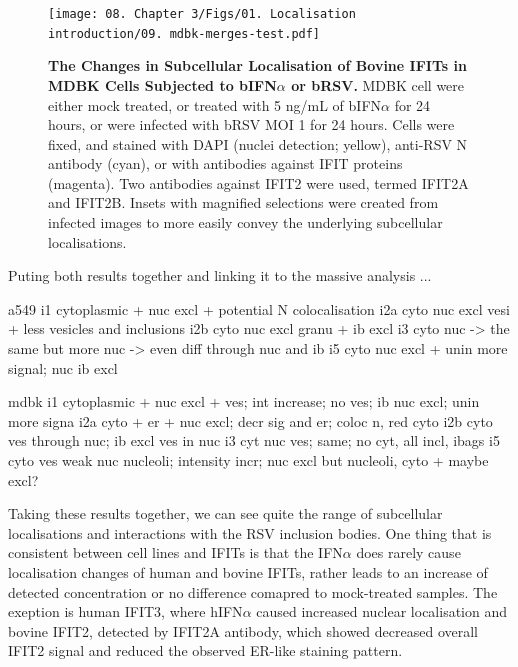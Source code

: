 \begin{figure}
    \centering
    \texttt{[image: 08. Chapter 3/Figs/01. Localisation introduction/09. mdbk-merges-test.pdf]}
    \caption[The Changes in Subcellular Localisation of Bovine IFITs in MDBK Cells Subjected to bIFN\(\alpha\) or bRSV.]{\textbf{The Changes in Subcellular Localisation of Bovine IFITs in MDBK Cells Subjected to bIFN\(\alpha\) or bRSV.} MDBK cell were either mock treated, or treated with 5 ng/mL of bIFN\(\alpha\) for 24 hours, or were infected with bRSV MOI 1 for 24 hours. Cells were fixed, and stained with DAPI (nuclei detection; yellow), anti-RSV N antibody (cyan), or with antibodies against IFIT proteins (magenta). Two antibodies against IFIT2 were used, termed IFIT2A and IFIT2B. Insets with magnified selections were created from infected images to more easily convey the underlying subcellular localisations.}
    \label{fig:The Changes in Subcellular Localisation of Bovine IFITs in MDBK Cells Subjected to bIFNa or bRSV}
\end{figure}

Puting both results together and linking it to the massive analysis ...

a549
i1 cytoplasmic + nuc excl + potential N colocalisation
i2a cyto nuc excl vesi + less vesicles and inclusions
i2b cyto nuc excl granu + ib excl
i3 cyto nuc -> the same but more nuc -> even diff through nuc and ib
i5 cyto nuc excl + unin more signal; nuc ib excl

mdbk
i1 cytoplasmic + nuc excl + ves; int increase; no ves; ib nuc excl; unin more signa
i2a cyto + er + nuc excl; decr sig and er; coloc n, red cyto
i2b cyto ves through nuc; ib excl ves in nuc
i3 cyt nuc ves; same; no cyt, all incl, ibags
i5 cyto ves weak nuc nucleoli; intensity incr; nuc excl but nucleoli, cyto + maybe excl?

Taking these results together, we can see quite the range of subcellular localisations and interactions with the RSV inclusion bodies. One thing that is consistent between cell lines and IFITs is that the IFN\(\alpha\) does rarely cause localisation changes of human and bovine IFITs, rather leads to an increase of detected concentration or no difference comapred to mock-treated samples. The exeption is human IFIT3, where hIFN\(\alpha\) caused increased nuclear localisation and bovine IFIT2, detected by IFIT2A antibody, which showed decreased overall IFIT2 signal and reduced the observed ER-like staining pattern. 



